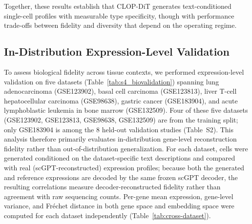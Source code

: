 \documentclass[fleqn,10pt,lineno]{wlpeerj}
\begin{document}
Together, these results establish that CLOP-DiT generates text-conditioned single-cell profiles with measurable type specificity, though with performance trade-offs between fidelity and diversity that depend on the operating regime.

\subsection*{In-Distribution Expression-Level Validation}\label{sec:cross-dataset}

To assess biological fidelity across tissue contexts, we performed expression-level validation on five datasets (Table~\ref{tab:s4_biovalidation}) spanning lung adenocarcinoma (GSE123902), basal cell carcinoma (GSE123813), liver T-cell hepatocellular carcinoma (GSE98638), gastric cancer (GSE183904), and acute lymphoblastic leukemia in bone marrow (GSE132509). Four of these five datasets (GSE123902, GSE123813, GSE98638, GSE132509) are from the training split; only GSE183904 is among the 8 held-out validation studies (Table~S2). This analysis therefore primarily evaluates in-distribution gene-level reconstruction fidelity rather than out-of-distribution generalization. For each dataset, cells were generated conditioned on the dataset-specific text descriptions and compared with real (scGPT-reconstructed) expression profiles; because both the generated and reference expressions are decoded by the same frozen scGPT decoder, the resulting correlations measure decoder-reconstructed fidelity rather than agreement with raw sequencing counts. Per-gene mean expression, gene-level variance, and Fr\'{e}chet distance in both gene space and embedding space were computed for each dataset independently (Table~\ref{tab:cross-dataset}).
\end{document}
